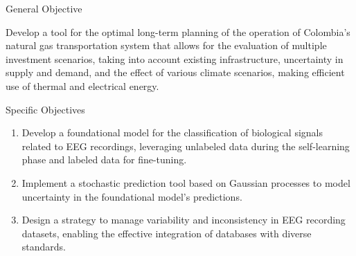 \documentclass[aspectratio=169,12pt]{beamer}
\begin{document}
\frame{\titlepage}

\begin{frame}{General Objective}
	\begin{block}{}
		Develop a tool for the optimal long-term planning of the operation of Colombia's natural gas transportation system that allows for the evaluation of multiple investment scenarios, taking into account existing infrastructure, uncertainty in supply and demand, and the effect of various climate scenarios, making efficient use of thermal and electrical energy.
	\end{block}
\end{frame}

\begin{frame}{Specific Objectives}
	\begin{block}{}
		\small
		\begin{enumerate}
			\item Develop a foundational model for the classification of biological signals related to EEG recordings, leveraging \textcolor{MyAccent}{unlabeled data} during the self-learning phase and labeled data for fine-tuning.
			\item Implement a \textcolor{MyAccent}{stochastic prediction} tool based on Gaussian processes to model uncertainty in the foundational model's predictions.
			\item Design a strategy to \textcolor{MyAccent}{manage variability and inconsistency} in EEG recording datasets, enabling the effective integration of databases with diverse standards.
		\end{enumerate}
	\end{block}
\end{frame}
	
\end{document}
